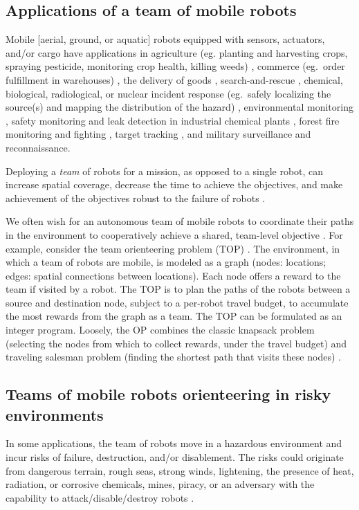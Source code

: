 \documentclass[11pt, oneside]{article}
\begin{document}
\subsection{Applications of a team of mobile robots}
Mobile [aerial, ground, or aquatic] robots equipped with sensors, actuators, and/or cargo have applications in agriculture (eg. planting and harvesting crops, spraying pesticide, monitoring crop health, killing weeds) \cite{santos2020path,bawden2017robot}, commerce (eg.\ order fulfillment in warehouses) \cite{wurman2008coordinating}, the delivery of goods \cite{coelho2014thirty}, search-and-rescue \cite{queralta2020collaborative}, chemical, biological, radiological, or nuclear incident response (eg.\ safely localizing the source(s) and mapping the distribution of the hazard) \cite{murphy2012projected,hutchinson2019unmanned}, environmental monitoring \cite{dunbabin2012robots,hernandez2012mobile,yuan2020maritime}, safety monitoring and leak detection in industrial chemical plants \cite{soldan2014towards,francis2022gas}, forest fire monitoring and fighting \cite{merino2012unmanned}, target tracking \cite{robin2016multi}, and military surveillance and reconnaissance. 

Deploying a \emph{team} of robots for a mission, as opposed to a single robot, can increase spatial coverage, decrease the time to achieve the objectives, and make achievement of the objectives robust to the failure of robots \cite{schranz2020swarm,brambilla2013swarm}.

We often wish for an autonomous team of mobile robots to coordinate their paths in the environment to cooperatively achieve a shared, team-level objective \cite{parker1995design,parker2007distributed}.
For example, consider the team orienteering problem (TOP) \cite{gunawan2016orienteering,vansteenwegen2011orienteering}. 
The environment, in which a team of robots are mobile, is modeled as a graph (nodes: locations; edges: spatial connections between locations). Each node offers a reward to the team if visited by a robot.
The TOP is to plan the paths of the robots between a source and destination node, subject to a per-robot travel budget, to accumulate the most rewards from the graph as a team. The TOP can be formulated as an integer program. Loosely, the OP combines the classic knapsack problem (selecting the nodes from which to collect rewards, under the travel budget) and traveling salesman problem (finding the shortest path that visits these nodes) \cite{vansteenwegen2011orienteering}.

\subsection{Teams of mobile robots orienteering in risky environments} 
In some applications, the team of robots move in a hazardous environment and incur risks of failure, destruction, and/or disablement. 
The risks could originate from dangerous terrain, rough seas, strong winds, lightening, the presence of heat, radiation, or corrosive chemicals, mines, piracy, or an adversary with the capability to attack/disable/destroy robots \cite{agmon2017robotic}. 
\end{document}
